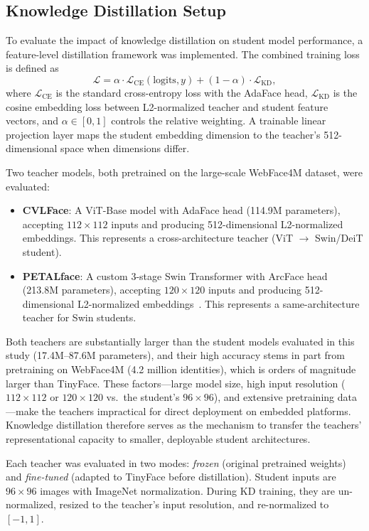 \documentclass[runningheads,a4paper]{llncs}
\begin{document}
\subsection{Knowledge Distillation Setup}\label{sec:kd-setup}
To evaluate the impact of knowledge distillation on student model performance, a feature-level distillation framework was implemented. The combined training loss is defined as
\begin{equation}\label{eq:kd-loss}
    \mathcal{L} = \alpha \cdot \mathcal{L}_{\text{CE}}(\text{logits}, y) + (1 - \alpha) \cdot \mathcal{L}_{\text{KD}},
\end{equation}
where $\mathcal{L}_{\text{CE}}$ is the standard cross-entropy loss with the AdaFace head, $\mathcal{L}_{\text{KD}}$ is the cosine embedding loss between L2-normalized teacher and student feature vectors, and $\alpha \in [0, 1]$ controls the relative weighting. A trainable linear projection layer maps the student embedding dimension to the teacher's 512-dimensional space when dimensions differ.

Two teacher models, both pretrained on the large-scale WebFace4M dataset, were evaluated:
\begin{itemize}
    \item \textbf{CVLFace}: A ViT-Base model with AdaFace head (114.9M parameters), accepting $112\times112$ inputs and producing 512-dimensional L2-normalized embeddings. This represents a cross-architecture teacher (ViT $\rightarrow$ Swin/DeiT student).
    \item \textbf{PETALface}: A custom 3-stage Swin Transformer with ArcFace head (213.8M parameters), accepting $120\times120$ inputs and producing 512-dimensional L2-normalized embeddings~\cite{narayan2025petalface}. This represents a same-architecture teacher for Swin students.
\end{itemize}
Both teachers are substantially larger than the student models evaluated in this study (17.4M--87.6M parameters), and their high accuracy stems in part from pretraining on WebFace4M (4.2 million identities), which is orders of magnitude larger than TinyFace. These factors---large model size, high input resolution ($112\times112$ or $120\times120$ vs.\ the student's $96\times96$), and extensive pretraining data---make the teachers impractical for direct deployment on embedded platforms. Knowledge distillation therefore serves as the mechanism to transfer the teachers' representational capacity to smaller, deployable student architectures.

Each teacher was evaluated in two modes: \emph{frozen} (original pretrained weights) and \emph{fine-tuned} (adapted to TinyFace before distillation). Student inputs are $96\times96$ images with ImageNet normalization. During KD training, they are un-normalized, resized to the teacher's input resolution, and re-normalized to $[-1, 1]$.
\end{document}
